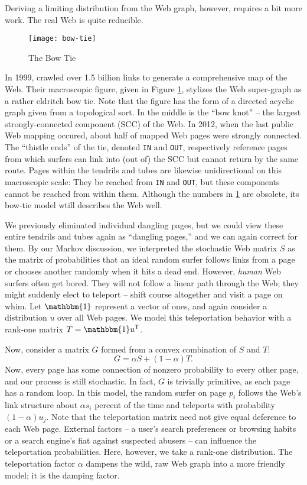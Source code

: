 \documentclass[../exploring-pagerank.tex]{subfiles}
\begin{document}
	Deriving a limiting distribution from the Web graph, however, requires a bit more work. The real Web is quite reducible.
    \begin{figure}
        \centering
        \texttt{[image: bow-tie]}
        \caption{The Bow Tie \cite{broderGraphStructureWeb}}
        \label{fig:bow-tie}
    \end{figure}
    In 1999, \cite{broderGraphStructureWeb} crawled over 1.5 billion links to generate a comprehensive map of the Web. Their macroscopic figure, given in Figure \ref{fig:bow-tie}, stylizes the Web super-graph as a rather eldritch bow tie. Note that the figure has the form of a directed acyclic graph given from a topological sort. In the middle is the ``bow knot'' -- the largest strongly-connected component (SCC) of the Web. In 2012, when the last public Web mapping occured, about half of mapped Web pages were strongly connected. The ``thistle ends'' of the tie, denoted \texttt{IN} and \texttt{OUT}, respectively reference pages from which surfers can link into (out of) the SCC but cannot return by the same route. Pages within the tendrils and tubes are likewise unidirectional on this macroscopic scale: They be reached from \texttt{IN} and \texttt{OUT}, but these components cannot be reached from within them. Although the numbers in \ref{fig:bow-tie} are obsolete, its bow-tie model wtill describes the Web well.

    We previously eliminated individual dangling pages, but we could view these entire tendrils and tubes again as ``dangling pages,'' and we can again correct for them. By our Markov discussion, we interpreted the stochastic Web matrix $S$ as the matrix of probabilities that an ideal random surfer follows links from a page or chooses another randomly when it hits a dead end. However, \textit{human} Web surfers often get bored. They will not follow a linear path through the Web; they might suddenly elect to teleport -- shift course altogether and visit a page on whim.
    Let $\mathbbm{1}$ represent a vector of ones, and again consider a distribution $u$ over all Web pages. We model this teleportation behavior with a rank-one matrix $T = \mathbbm{1}\transpose{u}$.

    Now, consider a matrix $G$ formed from a convex combination of $S$ and $T$:
	\begin{equation}
	    \label{eqn:google_matrix}
		G = \alpha S + (1-\alpha)T.
	\end{equation}
	Now, every page has some connection of nonzero probability to every other page, and our process is still stochastic. In fact, $G$ is trivially primitive, as each page has a random loop. In this model, the random surfer on page $p_i$ follows the Web's link structure about $\alpha s_i$ percent of the time and teleports with probability $(1-\alpha) u_j$. Note that the teleportation matrix need not give equal deference to each Web page. External factors -- a user's search preferences or browsing habits or a search engine's fiat against suspected abusers -- can influence the teleportation probabilities. Here, however, we take a rank-one distribution. The teleportation factor $\alpha$ dampens the wild, raw Web graph into a more friendly model; it is the damping factor.
\end{document}
